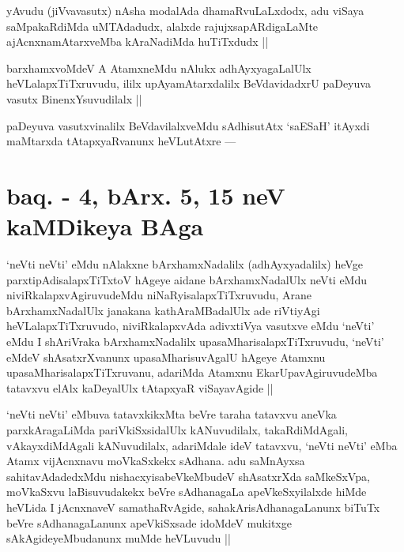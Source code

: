 \begin{artha}
yAvudu (jiVvavasutx) nAsha modalAda dhamaRvuLaLxdodx, adu viSaya saMpakaRdiMda uMTAdadudx, alalxde rajujxsapARdigaLaMte ajAcnxnamAtarxveMba kAraNadiMda huTiTxdudx ||
\end{artha}


\begin{artha}
barxhamxvoMdeV A AtamxneMdu nAlukx adhAyxyagaLalUlx heVLalapxTiTxruvudu, ililx upAyamAtarxdalilx BeVdavidadxrU paDeyuva vasutx BinenxYsuvudilalx ||
\end{artha}

\begin{artha}
paDeyuva vasutxvinalilx BeVdavilalxveMdu sAdhisutAtx `saESaH' itAyxdi maMtarxda tAtapxyaRvanunx heVLutAtxre ---
\end{artha}

\section*{baq. - 4, bArx. 5, 15 neV kaMDikeya BAga}

\begin{artha}
`neVti neVti' eMdu nAlakxne bArxhamxNadalilx (adhAyxyadalilx) heVge parxtipAdisalapxTiTxtoV hAgeye aidane bArxhamxNadalUlx neVti eMdu niviRkalapxvAgiruvudeMdu niNaRyisalapxTiTxruvudu, Arane bArxhamxNadalUlx janakana kathAraMBadalUlx ade riVtiyAgi heVLalapxTiTxruvudo, niviRkalapxvAda adivxtiVya vasutxve eMdu `neVti' eMdu I shAriVraka bArxhamxNadalilx upasaMharisalapxTiTxruvudu, `neVti' eMdeV shAsatxrXvanunx upasaMharisuvAgalU hAgeye Atamxnu upasaMharisalapxTiTxruvanu, adariMda Atamxnu EkarUpavAgiruvudeMba tatavxvu elAlx kaDeyalUlx tAtapxyaR viSayavAgide ||
\end{artha}

\begin{artha}
`neVti neVti' eMbuva tatavxkikxMta beVre taraha tatavxvu aneVka parxkAragaLiMda pariVkiSxsidalUlx kANuvudilalx, takaRdiMdAgali, vAkayxdiMdAgali kANuvudilalx, adariMdale ideV tatavxvu, `neVti neVti' eMba Atamx vijAcnxnavu moVkaSxkekx sAdhana. adu saMnAyxsa sahitavAdadedxMdu nishacxyisabeVkeMbudeV shAsatxrXda saMkeSxVpa, moVkaSxvu laBisuvudakekx beVre sAdhanagaLa apeVkeSxyilalxde hiMde heVLida I jAcnxnaveV samathaRvAgide, sahakArisAdhanagaLanunx biTuTx beVre sAdhanagaLanunx apeVkiSxsade idoMdeV mukitxge sAkAgideyeMbudanunx muMde heVLuvudu ||
\end{artha}

